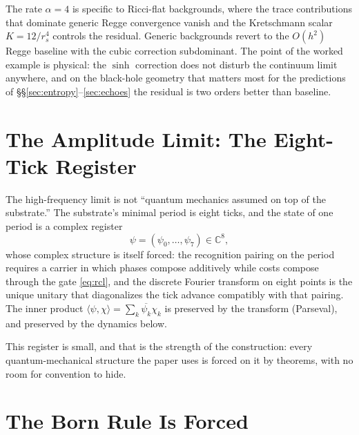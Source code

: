 \documentclass[11pt,letterpaper]{article}
\theoremstyle{definition}
\begin{document}
The rate $\alpha=4$ is specific to Ricci-flat backgrounds, where the
trace contributions that dominate generic Regge convergence vanish and
the Kretschmann scalar $K=12/r_s^4$ controls the residual.  Generic
backgrounds revert to the $O(h^2)$ Regge baseline with the cubic
correction subdominant.  The point of the worked example is physical:
the $\sinh$ correction does not disturb the continuum limit anywhere,
and on the black-hole geometry that matters most for the predictions of
\S\S\ref{sec:entropy}--\ref{sec:echoes} the residual is two orders
better than baseline.

\section{The Amplitude Limit: The Eight-Tick Register}
\label{sec:register}

The high-frequency limit is not ``quantum mechanics assumed on top of
the substrate.''  The substrate's minimal period is eight ticks, and
the state of one period is a complex register
\begin{equation}
\psi=(\psi_0,\ldots,\psi_7)\in\mathbb{C}^8 ,
\end{equation}
whose complex structure is itself forced: the recognition pairing on
the period requires a carrier in which phases compose additively while
costs compose through the gate \eqref{eq:rcl}, and the discrete Fourier
transform on eight points is the unique unitary that diagonalizes the
tick advance compatibly with that pairing.  The inner product
$\langle\psi,\chi\rangle=\sum_k\overline{\psi_k}\chi_k$ is preserved by
the transform (Parseval), and preserved by the dynamics below.

This register is small, and that is the strength of the construction:
every quantum-mechanical structure the paper uses is forced on it by
theorems, with no room for convention to hide.

\section{The Born Rule Is Forced}
\label{sec:born}
\end{document}
